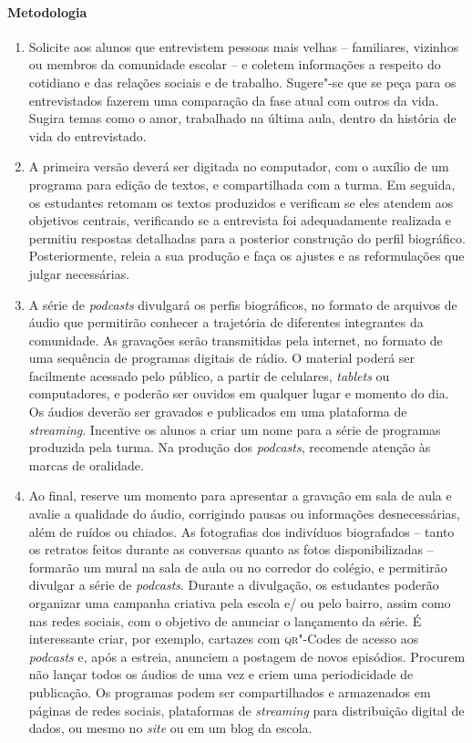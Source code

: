 \documentclass[11pt]{extarticle}
\begin{document}
 \paragraph{Metodologia}
   \begin{enumerate}
    \item
    Solicite aos alunos que
entrevistem pessoas mais velhas -- familiares, vizinhos ou membros da
comunidade escolar -- e coletem informações a respeito do cotidiano e
das relações sociais e de trabalho. Sugere"-se que se peça para os
entrevistados fazerem uma comparação da fase atual com outros da vida. Sugira 
temas como o amor, trabalhado na última aula, dentro da história
de vida do entrevistado.

  \item
  A primeira versão deverá ser digitada no computador, com o auxílio de um
programa para edição de textos, e compartilhada com a turma. Em seguida,
os estudantes retomam os textos produzidos e verificam se eles atendem
aos objetivos centrais, verificando se a entrevista foi adequadamente
realizada e permitiu respostas detalhadas para a posterior construção do
perfil biográfico. Posteriormente, releia a sua produção e faça os
ajustes e as reformulações que julgar necessárias.

  \item
A série de \emph{podcasts} divulgará os perfis biográficos, no formato
de arquivos de áudio que permitirão conhecer a trajetória de diferentes
integrantes da comunidade. As gravações serão transmitidas pela
internet, no formato de uma sequência de programas digitais de rádio. O
material poderá ser facilmente acessado pelo público, a partir de
celulares, \emph{tablets} ou computadores, e poderão ser ouvidos em
qualquer lugar e momento do dia. Os áudios deverão ser gravados e
publicados em uma plataforma de \textit{streaming}. Incentive os alunos a criar
um nome para a série de programas produzida pela turma. Na produção dos
\emph{podcasts}, recomende atenção às marcas de oralidade.


  \item
  Ao final, reserve um momento para apresentar a gravação em sala de aula
e avalie a qualidade do áudio, corrigindo pausas ou informações
desnecessárias, além de ruídos ou chiados. As fotografias dos indivíduos
biografados -- tanto os retratos feitos durante as conversas quanto as
fotos disponibilizadas -- formarão um mural na sala de aula ou no
corredor do colégio, e permitirão divulgar a série de \emph{podcasts}.
Durante a divulgação, os estudantes poderão organizar uma campanha
criativa pela escola e/ ou pelo bairro, assim como nas redes sociais,
com o objetivo de anunciar o lançamento da série. É interessante criar,
por exemplo, cartazes com \textsc{qr}"-Codes de acesso aos \emph{podcasts} e, após
a estreia, anunciem a postagem de novos episódios. Procurem não lançar
todos os áudios de uma vez e criem uma periodicidade de publicação. Os
programas podem ser compartilhados e armazenados em páginas de redes
sociais, plataformas de \textit{streaming} para distribuição digital de dados, ou
mesmo no \emph{site} ou em um blog da escola.

   \end{enumerate}
\end{document}
